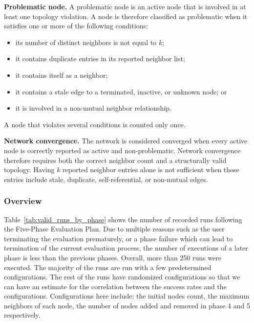 \textbf{Problematic node.}
A problematic node is an active node that is involved in at
least one topology violation. A node is therefore classified as
problematic when it satisfies one or more of the following conditions:

\begin{itemize}
  \item its number of distinct neighbors is not equal to \(k\);
  \item it contains duplicate entries in its reported neighbor list;
  \item it contains itself as a neighbor;
  \item it contains a stale edge to a terminated, inactive, or unknown node; or
  \item it is involved in a non-mutual neighbor relationship.
\end{itemize}

A node that violates several conditions is counted only once.

\textbf{Network convergence.}
The network is considered converged when every active node is
correctly reported as active and non-problematic.
Network convergence therefore requires both the correct neighbor count and a structurally valid topology. Having \(k\)
reported neighbor entries alone is not sufficient when those entries include stale, duplicate, self-referential, or
non-mutual edges.

\subsubsection{Overview}

Table~\ref{tab:valid_runs_by_phase} shows the number of recorded runs following the Five-Phase Evaluation Plan. Due to
multiple reasons such as the user terminating the evaluation prematurely, or a phase failure which can lead to
termination of the current evaluation process, the number of executions of a later phase is less than the previous
phases. Overall, more than 250 runs were executed. The majority of the runs are run with a few predetermined
configurations. The rest of the runs have randomized configurations so that we can have an estimate for the correlation
between the success rates and the configurations. Configurations here include: the initial nodes count, the maximum
neighbors of each node, the number of nodes added and removed in phase 4 and 5 respectively.

